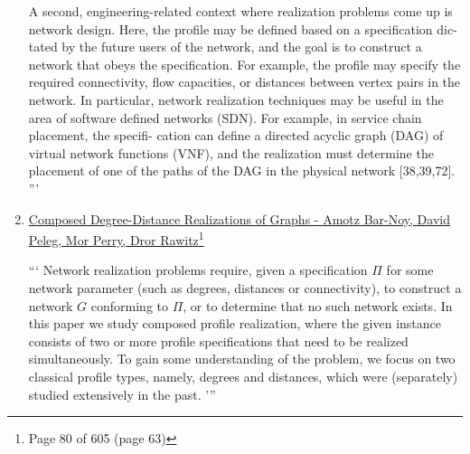 \documentclass[11pt,a4paper]{article}
\theoremstyle{definition}
\begin{document}
\begin{enumerate}
A second, engineering-related context where realization problems come up is
network design. Here, the profile may be defined based on a specification dic-
tated by the future users of the network, and the goal is to construct a network
that obeys the specification. For example, the profile may specify the required
connectivity, flow capacities, or distances between vertex pairs in the network. In
particular, network realization techniques may be useful in the area of software
defined networks (SDN). For example, in service chain placement, the specifi-
cation can define a directed acyclic graph (DAG) of virtual network functions
(VNF), and the realization must determine the placement of one of the paths of
the DAG in the physical network [38,39,72].
'''

\item 
\hyperlink{https://sci-hub.ru/https://link.springer.com/chapter/10.1007/978-3-030-79987-8_5}{Composed Degree-Distance Realizations of Graphs - Amotz Bar-Noy, David Peleg, Mor Perry, Dror Rawitz}\footnote{Page 80 of 605 (page 63)}

```
Network realization problems require, given a speciﬁcation $\Pi$
for some network parameter (such as degrees, distances or connectivity),
to construct a network $G$ conforming to $\Pi$, or to determine that no such
network exists. In this paper we study composed proﬁle realization, where
the given instance consists of two or more proﬁle speciﬁcations that need
to be realized simultaneously. To gain some understanding of the problem, we focus on two classical proﬁle types, namely, degrees and distances,
which were (separately) studied extensively in the past.
'''
\end{enumerate}
\end{document}
